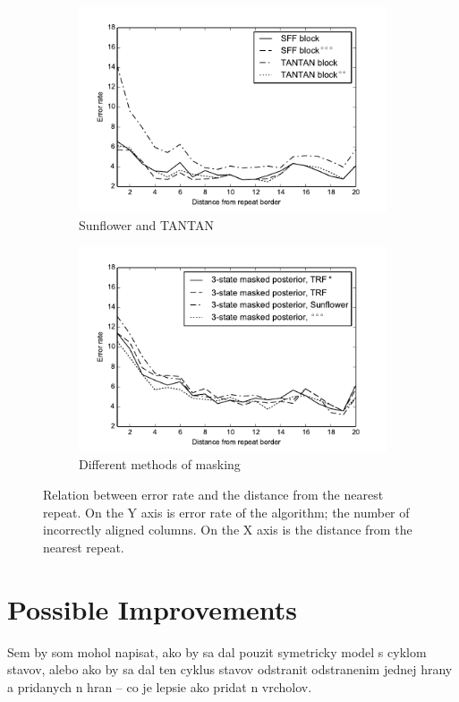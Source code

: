 \begin{figure}
\begin{center}
\begin{subfigure}{0.5\textwidth}
\includegraphics[width=\textwidth]{../figures/error_graph_sffvstantan.pdf}
\caption{Sunflower and TANTAN}
\end{subfigure}%
\begin{subfigure}{0.5\textwidth}
\includegraphics[width=\textwidth]{../figures/error_graph_3statemasking.pdf}
\caption{Different methods of masking}
\end{subfigure}%
\caption{
Relation between error rate and the distance from the nearest repeat. On the Y
axis is error rate of the algorithm; the number of incorrectly aligned columns.
On the X axis is the distance from the nearest repeat.  
}\label{FIGURE:SFF_GRAPHS} 
\end{center}
\end{figure}

\section{Possible Improvements}

\begin{reformulate*}
Sem by som mohol napisat, ako by sa dal pouzit symetricky model s cyklom
stavov, alebo ako by sa dal ten cyklus stavov odstranit odstranenim jednej
hrany a pridanych n hran -- co je lepsie ako pridat n vrcholov.
\end{reformulate*}

\label{LastPage}
